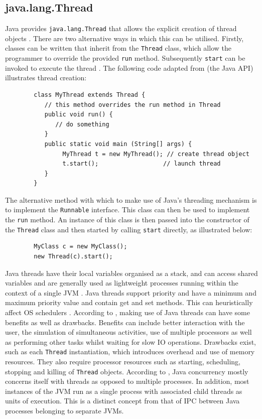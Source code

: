 \documentclass[12pt] {newrucsthesis}    %
\def\code#1{\texttt{#1}}
\begin{document}
      \subsection{java.lang.Thread}
        Java provides \code{java.lang.Thread} that allows the explicit creation of thread objects \citep{garg2005concurrent}.
        There are two alternative ways in which this can be utilised. Firstly, classes can be written that inherit from the
        \code{Thread} class, which allow the programmer to override the provided \code{run} method.
        Subsequently \code{start{}} can be invoked to execute the thread \citep{garg2005concurrent}.
        The following code adapted from \cite{JavaAPI} (the Java API) illustrates thread creation:
        \pagebreak
        \begin{verbatim}
        class MyThread extends Thread {
           // this method overrides the run method in Thread
           public void run() {
              // do something
           }
           public static void main (String[] args) {
                MyThread t = new MyThread(); // create thread object
                t.start();					// launch thread
           }
        }
        \end{verbatim}

        The alternative method with which to make use of Java's threading mechanism is to implement the
        \code{Runnable} interface. This class can then be used to implement the \code{run} method.
        An instance of this class is then passed into the constructor of the \code{Thread} class and
        then started by calling \code{start} directly, as illustrated below:
        \begin{verbatim}
        MyClass c = new MyClass();
        new Thread(c).start();
        \end{verbatim}

        Java threads  have their local variables organised as a stack, and can access shared variables and
        are generally used as lightweight processes running within the context of a single JVM \citep{trainBook}.
        Java threads support priority and have a minimum and maximum priority value and contain get and set methods.
        This can heuristically affect OS schedulers \citep{LeaConcurrentProgInJavaDesignPrinciplesPatterns}.
        According to \cite{HydeJavaThreadProg}, making use of Java threads can have some benefits as well as
        drawbacks. Benefits can include better interaction with the user, the simulation of simultaneous activities, use of multiple processors as well as performing other tasks whilst waiting for slow IO operations. Drawbacks exist, such as each \code{Thread} instantiation,
        which introduces overhead and use of memory resources. They also require processor resources such as
        starting, scheduling, stopping and killing of \code{Thread} objects. According to \cite{JavaAPI},
        Java concurrency mostly concerns itself with threads as opposed to multiple processes. In addition,
        most instances of the JVM run as a single process with associated child threads as units of execution.
        This is a distinct concept from that of IPC between Java processes belonging to separate JVMs.
\end{document}
